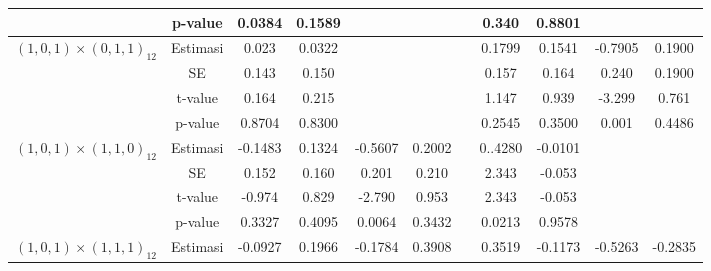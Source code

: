 \begin{enumerate}[label=\alph*.]
\begin{longtable}{|c|c|c|c|c|c|c|c|c|c|c|}
            & p-value
            & {0.0384} & {0.1589}
            & {} & {} & {}
            & {0.340} & {0.8801}
            & {} & {} \\ \hline

            \multirow{4}{*}{$(1,0,1)\times(0,1,1)_{12}$}
            & Estimasi
            & {0.023} & {0.0322}
            & {} & {} & {}
            & {0.1799} & {0.1541}
            & {-0.7905} & {0.1900} \\ \cline{2-11}

            & SE
            & {0.143} & {0.150}
            & {} & {} & {}
            & {0.157} & {0.164}
            & {0.240} & {0.1900} \\ \cline{2-11}

            & t-value
            & {0.164} & {0.215}
            & {} & {} & {}
            & {1.147} & {0.939}
            & {-3.299} & {0.761} \\ \cline{2-11}

            & p-value
            & {0.8704} & {0.8300}
            & {} & {} & {}
            & {0.2545} & {0.3500}
            & {0.001} & {}0.4486 \\ \hline

            \multirow{2}{*}{$(1,0,1)\times(1,1,0)_{12}$}
            & Estimasi
            & {-0.1483} & {0.1324}
            & {-0.5607} & {0.2002} & {}
            & {0..4280} & {-0.0101}
            & {} & {} \\ \cline{2-11}

            & SE
            & {0.152} & {0.160}
            & {0.201} & {0.210} & {}
            & {2.343} & {-0.053}
            & {} & {} \\ \cline{2-11}

            & t-value
            & {-0.974} & {0.829}
            & {-2.790} & {0.953} & {}
            & {2.343} & {-0.053}
            & {} & {} \\ \cline{2-11}

            & p-value
            & {0.3327} & {0.4095}
            & {0.0064} & {0.3432} & {}
            & {0.0213} & {0.9578}
            & {} & {}  \\ \hline

            \multirow{4}{*}{$(1,0,1)\times(1,1,1)_{12}$}
            & Estimasi
            & {-0.0927} & {0.1966}
            & {-0.1784} & {0.3908} & {}
            & {0.3519} & {-0.1173}
            & {-0.5263} & {-0.2835} \\ \cline{2-11}


\end{longtable}
\end{enumerate}

